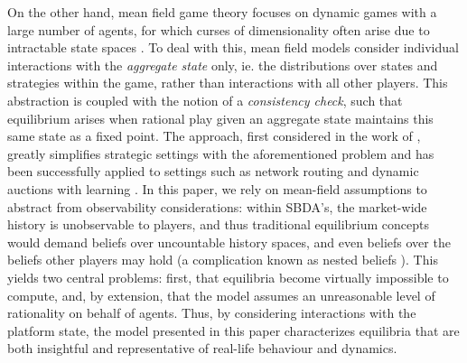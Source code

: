 On the other hand, mean field game theory focuses on dynamic games with a large number of agents, for which curses of dimensionality often arise due to intractable state spaces \citep{maskin2001markov}.
To deal with this, mean field models consider individual interactions with the \textit{aggregate state} only, ie. the distributions over states and strategies within the game, rather than interactions with all other players.
This abstraction is coupled with the notion of a \textit{consistency check}, such that equilibrium arises when rational play given an aggregate state maintains this same state as a fixed point. 
The approach, first considered in the work of \cite{jovanovic1988anonymous}, greatly simplifies strategic settings with the aforementioned problem and has been successfully applied to settings such as network routing \citep{calderone2017markov} and dynamic auctions with learning \citep{iyer2014mean}.
In this paper, we rely on mean-field assumptions to abstract from observability considerations: within SBDA's, the market-wide history is unobservable to players, and thus traditional equilibrium concepts would demand beliefs over uncountable history spaces, and even beliefs over the beliefs other players may hold (a complication known as nested beliefs \citep{brandenburger1993hierarchies}).
This yields two central problems: first, that equilibria become virtually impossible to compute, and, by extension, that the model assumes an unreasonable level of rationality on behalf of agents.
Thus, by considering interactions with the platform state, the model presented in this paper characterizes equilibria that are both insightful and representative of real-life behaviour and dynamics.


